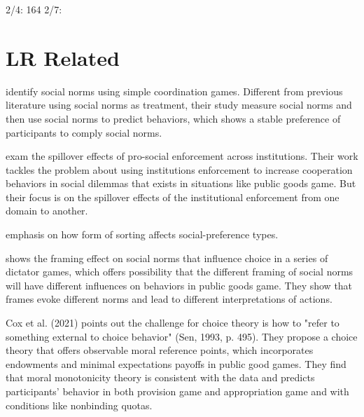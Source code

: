 \documentclass{article}
\begin{document}

2/4: 164
2/7: 

\section{LR Related}

\cite{krupka2013identifying} identify social norms using simple coordination games. Different from previous literature using social norms as treatment, their study measure social norms and then use social norms to predict behaviors, which shows a stable preference of participants to comply social norms. 

\cite{engl2021spillover} exam the spillover effects of pro-social enforcement across institutions. Their work tackles the problem about using institutions enforcement to increase cooperation behaviors in social dilemmas that exists in situations like public goods game. But their focus is on the spillover effects of the institutional enforcement from one domain to another. 

\cite{lazear2012sorting} emphasis on how form of sorting affects social-preference types. 

\cite{chang2019rhetoric} shows the framing effect on social norms that influence choice in a series of dictator games, which offers possibility that the different framing of social norms will have different influences on behaviors in public goods game. They show that frames evoke different norms and lead to different interpretations of actions. 

Cox et al. (2021) points out the challenge for choice theory is how to "refer to something external to choice behavior" (Sen, 1993, p. 495). They propose a choice theory that offers observable moral reference points, which incorporates endowments and minimal expectations payoffs in public good games. They find that moral monotonicity theory is consistent with the data and predicts participants' behavior in both provision game and appropriation game and with conditions like nonbinding quotas.  
\end{document}
